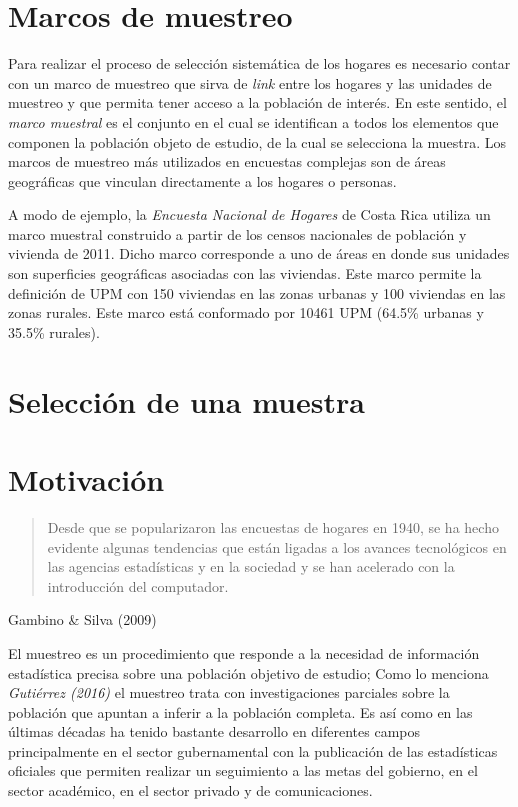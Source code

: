\documentclass[
  12pt,
]{book}
\begin{document}
\hypertarget{marcos-de-muestreo}{%
\section{Marcos de muestreo}\label{marcos-de-muestreo}}

Para realizar el proceso de selección sistemática de los hogares es necesario contar con un marco de muestreo que sirva de \emph{link} entre los hogares y las unidades de muestreo y que permita tener acceso a la población de interés. En este sentido, el \emph{marco muestral} es el conjunto en el cual se identifican a todos los elementos que componen la población objeto de estudio, de la cual se selecciona la muestra. Los marcos de muestreo más utilizados en encuestas complejas son de áreas geográficas que vinculan directamente a los hogares o personas.

A modo de ejemplo, la \emph{Encuesta Nacional de Hogares} de Costa Rica utiliza un marco muestral construido a partir de los censos nacionales de población y vivienda de 2011. Dicho marco corresponde a uno de áreas en donde sus unidades son superficies geográficas asociadas con las viviendas. Este marco permite la definición de UPM con 150 viviendas en las zonas urbanas y 100 viviendas en las zonas rurales. Este marco está conformado por 10461 UPM (64.5\% urbanas y 35.5\% rurales).

\hypertarget{selecciuxf3n-de-una-muestra}{%
\section{Selección de una muestra}\label{selecciuxf3n-de-una-muestra}}

\hypertarget{motivaciuxf3n}{%
\section{Motivación}\label{motivaciuxf3n}}

\begin{quote}
Desde que se popularizaron las encuestas de hogares en 1940, se ha hecho evidente algunas tendencias que están ligadas a los avances tecnológicos en las agencias estadísticas y en la sociedad y se han acelerado con la introducción del computador.
\end{quote}

Gambino \& Silva (2009)

El muestreo es un procedimiento que responde a la necesidad de información estadística precisa sobre una población objetivo de estudio; Como lo menciona \emph{Gutiérrez (2016)} el muestreo trata con investigaciones parciales sobre la población que apuntan a inferir a la población completa. Es así como en las últimas décadas ha tenido bastante desarrollo en diferentes campos principalmente en el sector gubernamental con la publicación de las estadísticas oficiales que permiten realizar un seguimiento a las metas del gobierno, en el sector académico, en el sector privado y de comunicaciones.
\end{document}
